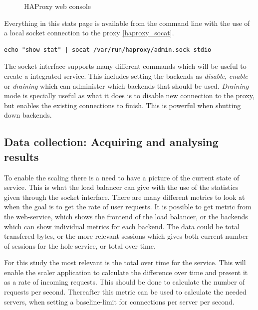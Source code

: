 \begin{figure}[htp]
\centering
{}
\caption{\label{fig:haproxy_web_stats}HAProxy web console}
\end{figure}

Everything in this stats page is available from the command line with the use
of a local socket connection to the proxy \ref{haproxy_socat}.

\begin{lstlisting}[label=haproxy_socat,caption=Getting statistics from HAProxy
with sockets,numbers=none]
echo "show stat" | socat /var/run/haproxy/admin.sock stdio
\end{lstlisting}

The socket interface supports many different commands which will be useful to
create a integrated service. This includes setting the backends as
\textit{disable}, \textit{enable} or \textit{draining} which can administer
which backends that should be used. \textit{Draining} mode is specially useful
as what it does is to disable new connection to the proxy, but enables the
existing connections to finish. This is powerful when shutting down backends.

\subsection{Data collection: Acquiring and analysing results}
\label{approach:data}
To enable the scaling there is a need to have a picture of the current state of
service. This is what the load balancer can give with the use of the statistics
given through the socket interface. There are many different metrics to look at
when the goal is to get the rate of user requests. It is possible to get metric
from the web-service, which shows the frontend of the load balancer, or the
backends which can show individual metrics for each backend. The data could be
total transfered bytes, or the more relevant sessions which gives both current
number of sessions for the hole service, or total over time.

For this study the most relevant is the total over time for the service. This
will enable the scaler application to calculate the difference over time and
present it as a rate of incoming requests. This should be done to calculate the
number of requests per second. Thereafter this metric can be used to calculate
the needed servers, when setting a baseline-limit for connections per server
per second.

